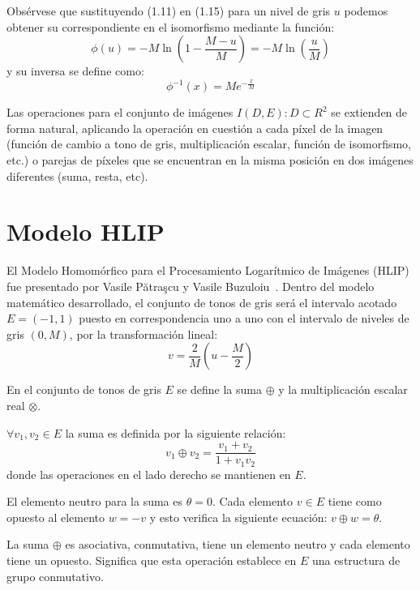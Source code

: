 Obs\'ervese que sustituyendo (1.11) en (1.15) para un nivel de gris $u$ podemos obtener su correspondiente en el isomorfismo mediante la funci\'on:
\begin{equation}
	\phi(u) = -M\ln\left(1-\frac{M-u}{M}\right) = -M\ln\left(\frac{u}{M}\right)
\end{equation}
y su inversa se define como:
\begin{equation}
	\phi^{-1}(x) = Me^{-\frac{x}{M}} 
\end{equation}

Las operaciones para el conjunto de im\'agenes $I(D,E):D\subset R^2$ se extienden de forma natural, aplicando la operaci\'on en cuesti\'on a cada p\'ixel de la imagen (funci\'on de cambio a tono de gris, multiplicaci\'on escalar, funci\'on de isomorfismo, etc.) o parejas de p\'ixeles que se encuentran en la misma posici\'on en dos im\'agenes diferentes (suma, resta, etc). 

\section{Modelo HLIP}

El Modelo Homom\'orfico para el Procesamiento Logar\'itmico de Im\'agenes (HLIP) fue presentado por Vasile Pătraşcu y Vasile Buzuloiu~\cite{patrascu2014mathematical}. Dentro del modelo matemático desarrollado, el conjunto de tonos de gris será el intervalo acotado $E = (-1, 1)$ puesto en correspondencia uno a uno con el intervalo de niveles de gris $(0,M)$, por la transformaci\'on lineal:
\begin{equation}
	v=\frac{2}{M}\left(u-\frac{M}{2}\right)
\end{equation}

En el conjunto de tonos de gris $E$ se define la suma $\oplus$ y la multiplicación escalar real $\otimes$.

$\forall v_1,v_2 \in E$ la suma es definida por la siguiente relaci\'on:
\begin{equation}
	v_1 \oplus v_2=\frac{v_1+v_2}{1+v_1v_2}
\end{equation}
donde las operaciones en el lado derecho se mantienen en $E$.

El elemento neutro para la suma es $\theta = 0$. Cada elemento $v \in E$ tiene como opuesto al elemento $w = - v$ y esto verifica la siguiente ecuación: $v \oplus w = \theta$.

La suma $\oplus$ es asociativa, conmutativa, tiene un elemento neutro y cada elemento tiene un opuesto. Significa que esta operación establece en $E$ una estructura de grupo conmutativo.

